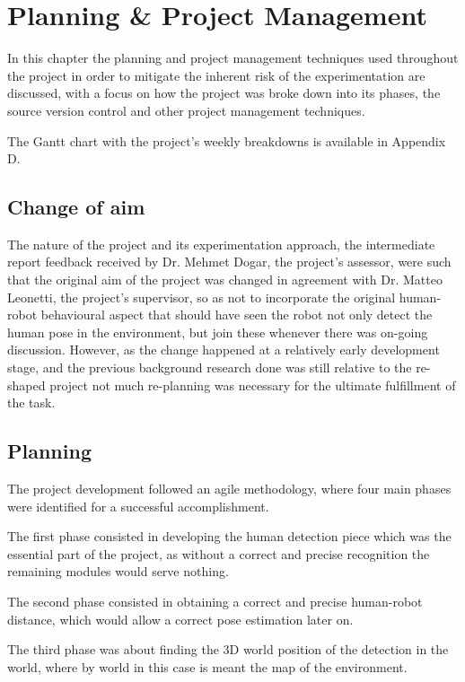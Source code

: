 \chapter{Planning \& Project Management}
\label{chapter7}

In this chapter the planning and project management techniques used throughout the project in order to mitigate the inherent risk of the experimentation are discussed, with a focus on how the project was broke down into its phases, the source version control and other project management techniques.

The Gantt chart with the project's weekly breakdowns is available in Appendix D.

\section{Change of aim}

The nature of the project and its experimentation approach, the intermediate report feedback received by Dr. Mehmet Dogar, the project's assessor, were such that the original aim of the project was changed in agreement with Dr. Matteo Leonetti, the project's supervisor, so as not to incorporate the original human-robot behavioural aspect that should have seen the robot not only detect the human pose in the environment, but join these whenever there was on-going discussion. However, as the change happened at a relatively early development stage, and the previous background research done was still relative to the re-shaped project not much re-planning was necessary for the ultimate fulfillment of the task.

\section{Planning}

The project development followed an agile methodology, where four main phases were identified for a successful accomplishment.

The first phase consisted in developing the human detection piece which was the essential part of the project, as without a correct and precise recognition the remaining modules would serve nothing.

The second phase consisted in obtaining a correct and precise human-robot distance, which would allow a correct pose estimation later on.

The third phase was about finding the 3D world position of the detection in the world, where by world in this case is meant the map of the environment.

